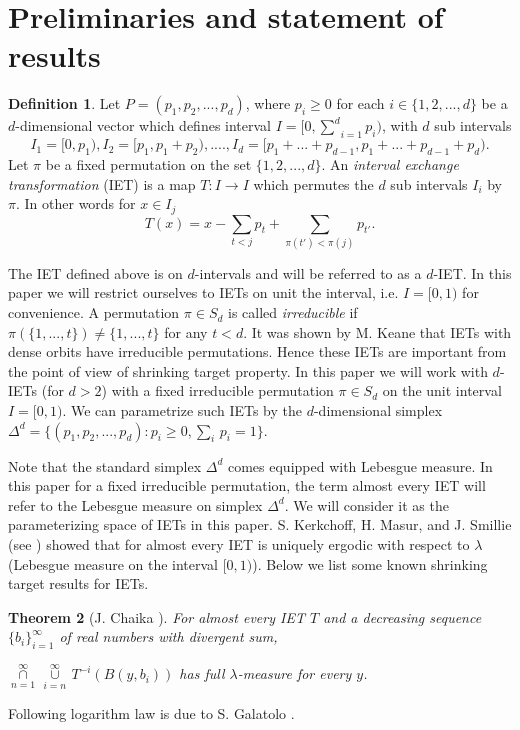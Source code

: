 \documentclass[11pt, english, reqno]{amsart}
\newtheorem{theorem}{Theorem}[section]
\theoremstyle{definition}
\newtheorem{definition}[theorem]{Definition}
\theoremstyle{remark}
\numberwithin{equation}{section}
\numberwithin{equation}{section}
\newcommand{\LS}{\ensuremath{\underset{n=1}{\overset{\infty}{\cap}} \, {\underset{i=n}{\overset{\infty}{\cup}}}\,}}
\begin{document}
\section{Preliminaries and statement of results}\label{Prelim}

\begin{definition}\label{IET} Let $P=(p_1,p_2,...,p_d)$, where $p_i \geq 0$ for each $i \in \{1,2,...,d\}$ be a $d$-dimensional vector which defines interval $ I = [0,\underset{i=1}{\overset{d}{\sum}} p_i)$, with $d$ sub intervals $$I_1 = [0,p_1), I_2 = [p_1, p_1+p_2),....,I_d = [p_1+...+p_{d-1}, p_1+...+p_{d-1}+p_d).$$  Let $\pi$ be a fixed permutation on the set $\{1,2,...,d\}$. An \textit{interval exchange transformation} (IET) is a map $T : I \rightarrow I$ which permutes the $d$ sub intervals $I_i$ by $\pi$. In other words for $x \in I_j$  $$T(x)= x - \underset{t<j}{\sum} p_t +\underset{\pi(t')<\pi(j)}{\sum} p_{t'}.$$ 
\end{definition} The IET defined above is on $d$-intervals and will be referred to as a $d$-IET. In this paper we will restrict ourselves to IETs on unit the interval, i.e. $I = [0,1)$ for convenience. A permutation $\pi \in S_d$ is called \textit{irreducible} if $\pi(\{1,...,t\}) \neq \{1,...,t\}$ for any $t < d$. It was shown by M. Keane \cite{Keane_1975} that IETs with dense orbits have irreducible permutations. Hence these IETs are important from the point of view of shrinking target property. In this paper we will work with $d$-IETs (for $d > 2$) with a fixed irreducible permutation $\pi \in S_d$ on the unit interval $I=[0,1)$. We can parametrize such IETs by the $d$-dimensional simplex $\Delta^d = \{(p_1,p_2,...,p_d) : p_i\geq 0, \underset{i}{\sum}\, p_i = 1\}$. 

Note that the standard simplex $\Delta^d$ comes equipped with Lebesgue measure. In this paper for a fixed irreducible permutation, the term almost every IET will refer to the Lebesgue measure on simplex $\Delta^d$. We will consider it as the parameterizing space of IETs in this paper. S. Kerkchoff, H. Masur, and J. Smillie (see \cite{Kerckhoff_Masur_Smillie_1986}) showed that for almost every IET is uniquely ergodic with respect to $\lambda$ (Lebesgue measure on the interval $[0,1)$). Below we list some known shrinking target results for IETs.

\begin{theorem} [J. Chaika \cite{Chaika_2011}]\label{Chaika} For almost every IET $T$ and a decreasing sequence $\{b_i\}_{i=1}^{\infty}$ of real numbers with divergent sum,

\begin{center}
$\LS T^{-i}\left(B(y,b_i)\right)$ has full $\lambda$-measure for every
$y$.

\end{center}

\end{theorem} Following logarithm law is due to S. Galatolo \cite{Galatolo_2006}.
\end{document}
